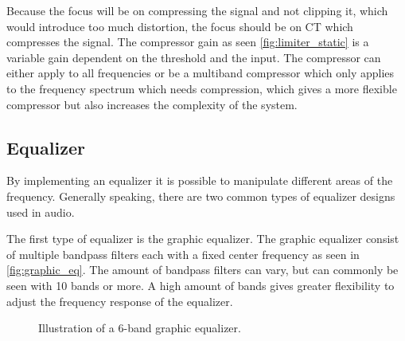 Because the focus will be on compressing the signal and not clipping it, which would introduce too much distortion, the focus should be on CT which compresses the signal. The compressor gain as seen \autoref{fig:limiter_static} is a variable gain dependent on the threshold and the input. The compressor can either apply to all frequencies or be a multiband compressor which only applies to the frequency spectrum which needs compression, which gives a more flexible compressor but also increases the complexity of the system. 

\subsection*{Equalizer}
By implementing an equalizer it is possible to manipulate different areas of the frequency. Generally speaking, there are two common types of equalizer designs used in audio.

The first type of equalizer is the graphic equalizer. The graphic equalizer consist of multiple bandpass filters each with a fixed center frequency as seen in \autoref{fig:graphic_eq}. The amount of bandpass filters can vary, but can commonly be seen with 10 bands or more. A high amount of bands gives greater flexibility to adjust the frequency response of the equalizer.

\begin{figure}[H]
\centering
{}

\caption{Illustration of a 6-band graphic equalizer.}
\label{fig:graphic_eq}
\end{figure}

